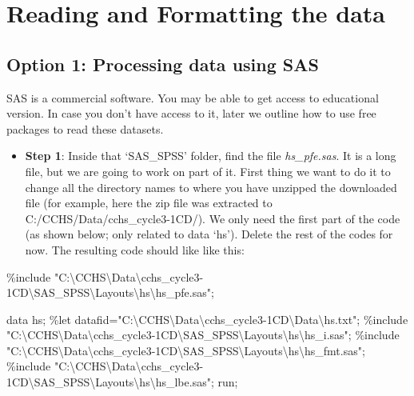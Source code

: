 \documentclass[
]{book}
\newenvironment{Shaded}{\begin{snugshade}}{\end{snugshade}}
\newcommand{\NormalTok}[1]{#1}
\newcommand{\OtherTok}[1]{\textcolor[rgb]{0.56,0.35,0.01}{#1}}
\newcommand{\StringTok}[1]{\textcolor[rgb]{0.31,0.60,0.02}{#1}}
\providecommand{\tightlist}{%
  \setlength{\itemsep}{0pt}\setlength{\parskip}{0pt}}
\begin{document}
\hypertarget{reading-and-formatting-the-data}{%
\section{Reading and Formatting the data}\label{reading-and-formatting-the-data}}

\hypertarget{option-1-processing-data-using-sas}{%
\subsection{Option 1: Processing data using SAS}\label{option-1-processing-data-using-sas}}

SAS is a commercial software. You may be able to get access to educational version. In case you don't have access to it, later we outline how to use free packages to read these datasets.

\begin{itemize}
\tightlist
\item
  \textbf{Step 1}: Inside that `SAS\_SPSS' folder, find the file \emph{hs\_pfe.sas}. It is a long file, but we are going to work on part of it. First thing we want to do it to change all the directory names to where you have unzipped the downloaded file (for example, here the zip file was extracted to C:/CCHS/Data/cchs\_cycle3-1CD/). We only need the first part of the code (as shown below; only related to data `hs'). Delete the rest of the codes for now. The resulting code should like like this:
\end{itemize}

\begin{Shaded}
\begin{Highlighting}[]
\NormalTok{\%include }\StringTok{"C:\textbackslash{}CCHS\textbackslash{}Data\textbackslash{}cchs\_cycle3{-}1CD\textbackslash{}SAS\_SPSS\textbackslash{}Layouts\textbackslash{}hs\textbackslash{}hs\_pfe.sas"}\NormalTok{;}

\NormalTok{data hs;}
\NormalTok{        \%let datafid}\OtherTok{=}\StringTok{"C:\textbackslash{}CCHS\textbackslash{}Data\textbackslash{}cchs\_cycle3{-}1CD\textbackslash{}Data\textbackslash{}hs.txt"}\NormalTok{;}
\NormalTok{        \%include }\StringTok{"C:\textbackslash{}CCHS\textbackslash{}Data\textbackslash{}cchs\_cycle3{-}1CD\textbackslash{}SAS\_SPSS\textbackslash{}Layouts\textbackslash{}hs\textbackslash{}hs\_i.sas"}\NormalTok{;}
\NormalTok{        \%include }\StringTok{"C:\textbackslash{}CCHS\textbackslash{}Data\textbackslash{}cchs\_cycle3{-}1CD\textbackslash{}SAS\_SPSS\textbackslash{}Layouts\textbackslash{}hs\textbackslash{}hs\_fmt.sas"}\NormalTok{;}
\NormalTok{        \%include }\StringTok{"C:\textbackslash{}CCHS\textbackslash{}Data\textbackslash{}cchs\_cycle3{-}1CD\textbackslash{}SAS\_SPSS\textbackslash{}Layouts\textbackslash{}hs\textbackslash{}hs\_lbe.sas"}\NormalTok{;}
\NormalTok{run;}
\end{Highlighting}
\end{Shaded}
\end{document}
